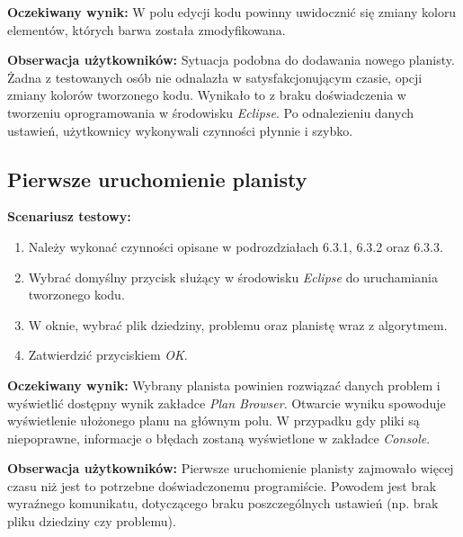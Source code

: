 \textbf{Oczekiwany wynik:} W polu edycji kodu powinny uwidocznić się zmiany koloru elementów, których barwa została zmodyfikowana.

\textbf{Obserwacja użytkowników:} Sytuacja podobna do dodawania nowego planisty. Żadna z testowanych osób nie odnalazła w satysfakcjonującym czasie, opcji zmiany kolorów tworzonego kodu. Wynikało to z braku doświadczenia w tworzeniu oprogramowania w środowisku \textit{Eclipse}. Po odnalezieniu danych ustawień, użytkownicy wykonywali czynności płynnie i szybko. 
\subsection{Pierwsze uruchomienie planisty}
\textbf{Scenariusz testowy:}
  \begin{enumerate}
  
\item Należy wykonać czynności opisane w podrozdziałach 6.3.1, 6.3.2 oraz 6.3.3.
\item Wybrać domyślny przycisk służący w środowisku \textit{Eclipse} do uruchamiania tworzonego kodu.
\item W oknie, wybrać plik dziedziny, problemu oraz planistę wraz z algorytmem.
\item Zatwierdzić przyciskiem \textit{OK}. 
\end{enumerate}

\textbf{Oczekiwany wynik:} Wybrany planista powinien rozwiązać danych problem i wyświetlić dostępny wynik zakładce \textit{Plan Browser}. Otwarcie wyniku spowoduje wyświetlenie ułożonego planu na głównym polu. W przypadku gdy pliki są niepoprawne, informacje o błędach zostaną wyświetlone w zakładce \textit{Console}. 

\textbf{Obserwacja użytkowników:} Pierwsze uruchomienie planisty zajmowało więcej czasu niż jest to potrzebne doświadczonemu programiście. Powodem jest brak wyraźnego komunikatu, dotyczącego braku poszczególnych ustawień (np. brak pliku dziedziny czy problemu).



